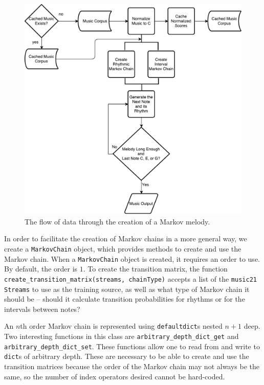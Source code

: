 \begin{figure}[h!]
	\centering
	\includegraphics[width=\linewidth]{figures/markov_flowchart.pdf}
	\caption{The flow of data through the creation of a Markov melody.}
	\label{fig:markovflowchart}
\end{figure}

In order to facilitate the creation of Markov chains in a more general way, we create a \texttt{MarkovChain} object, which provides methods to create and use the Markov chain.
When a \texttt{MarkovChain} object is created, it requires an order to use.
By default, the order is $1$.
To create the transition matrix, the function \texttt{create\_transition\_matrix(streams, chainType)} accepts a list of the \texttt{music21} \texttt{Streams} to use as the training source, as well as what type of Markov chain it should be -- should it calculate transition probabilities for rhythms or for the intervals between notes?

An $n$th order Markov chain is represented using \texttt{defaultdict}s nested $n + 1$ deep.
Two interesting functions in this class are \texttt{arbitrary\_depth\_dict\_get} and \texttt{arbitrary\_depth\_dict\_set}.
These functions allow one to read from and write to \texttt{dict}s of arbitrary depth.
These are necessary to be able to create and use the transition matrices because the order of the Markov chain may not always be the same, so the number of index operators desired cannot be hard-coded.

